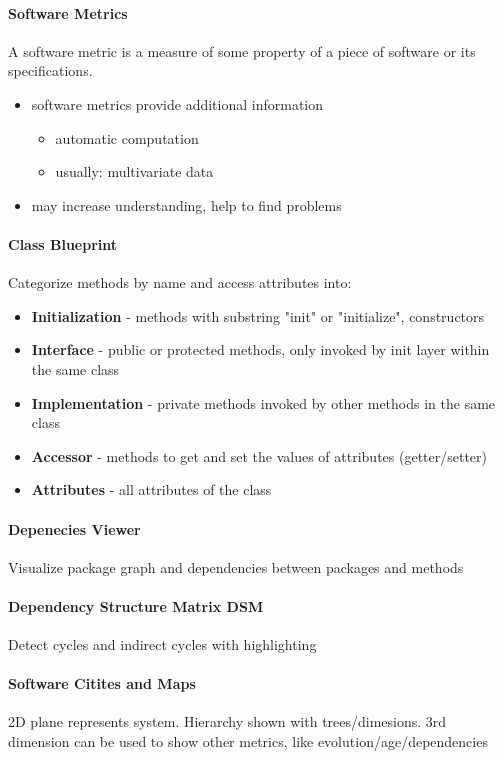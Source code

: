 \documentclass[10pt,a4paper]{article}
\begin{document}
	\paragraph{Software Metrics} A software metric is a measure of some property of a
	piece of software or its specifications.
	\begin{itemize}
		\item software metrics provide additional information
		\begin{itemize}
			\item automatic computation
			\item usually: multivariate data
		\end{itemize}
		\item may increase understanding, help to find problems
	\end{itemize}
	
	\paragraph{Class Blueprint}
	Categorize methods by name and access attributes into:
	\begin{itemize}
		\item \textbf{Initialization} - methods with substring "init" or "initialize", constructors
		\item \textbf{Interface} - public or protected methods, only invoked by init layer within the same class 
		\item \textbf{Implementation} - private methods invoked by other methods in the same class
		\item \textbf{Accessor} - methods to get and set the values of attributes (getter/setter)
		\item \textbf{Attributes} - all attributes of the class
	\end{itemize}
	
	\paragraph{Depenecies Viewer}
	Visualize package graph and dependencies between packages and methods
	
	\paragraph{Dependency Structure Matrix DSM}
	Detect cycles and indirect cycles with highlighting

	\paragraph{Software Citites and Maps}
	2D plane represents system. Hierarchy shown with trees/dimesions. 3rd dimension can be used to show other metrics, like evolution/age/dependencies
	
\end{document}
